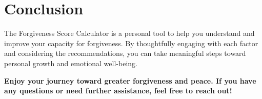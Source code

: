 \documentclass[11pt]{article}
\begin{document}
\section*{Conclusion}

The Forgiveness Score Calculator is a personal tool to help you understand and improve your capacity for forgiveness. By thoughtfully engaging with each factor and considering the recommendations, you can take meaningful steps toward personal growth and emotional well-being.

\bigskip

\textbf{Enjoy your journey toward greater forgiveness and peace. If you have any questions or need further assistance, feel free to reach out!}
\end{document}
